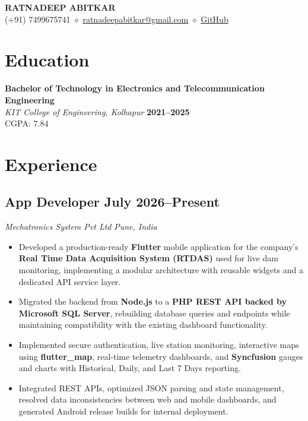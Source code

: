 \documentclass[10pt,a4paper]{article}
\begin{document}
\begin{center}
    {\LARGE \textbf{RATNADEEP ABITKAR}} \\[-1pt]
    (+91) 7499675741
    $\diamond$
    \href{mailto:ratnadeepabitkar@gmail.com}{ratnadeepabitkar@gmail.com}
    $\diamond$
    \href{https://github.com/ratnadeep2003}{GitHub}
\end{center}

\vspace{-5pt}

\section{Education}

\textbf{Bachelor of Technology in Electronics and Telecommunication Engineering} \\
\textit{KIT College of Engineering, Kolhapur}
\hfill
\textbf{2021--2025} \\
CGPA: 7.84

\section{Experience}

\subsection{App Developer \hfill July 2026--Present}
\textit{Mechatronics System Pvt Ltd}
\hfill
\textit{Pune, India}

\begin{itemize}
    \item Developed a production-ready \textbf{Flutter} mobile application for the company's \textbf{Real Time Data Acquisition System (RTDAS)} used for live dam monitoring, implementing a modular architecture with reusable widgets and a dedicated API service layer.

    \item Migrated the backend from \textbf{Node.js} to a \textbf{PHP REST API backed by Microsoft SQL Server}, rebuilding database queries and endpoints while maintaining compatibility with the existing dashboard functionality.

    \item Implemented secure authentication, live station monitoring, interactive maps using \textbf{flutter\_map}, real-time telemetry dashboards, and \textbf{Syncfusion} gauges and charts with Historical, Daily, and Last 7 Days reporting.

    \item Integrated REST APIs, optimized JSON parsing and state management, resolved data inconsistencies between web and mobile dashboards, and generated Android release builds for internal deployment.
\end{itemize}
\end{document}
